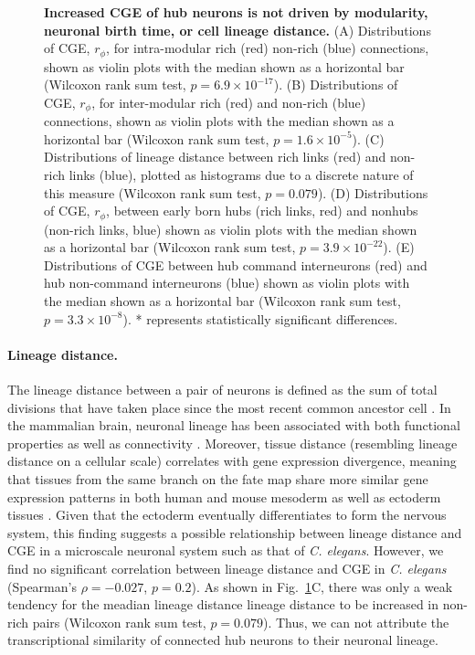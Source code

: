 \documentclass[10pt,letterpaper]{article}
\begin{document}
{\begin{figure}[!h]
\centering
 \caption{
 \textbf{Increased CGE of hub neurons is not driven by modularity, neuronal birth time, or cell lineage distance.}
(A) Distributions of CGE, $r_\phi$, for intra-modular rich (red) non-rich (blue) connections, shown as violin plots with the median shown as a horizontal bar (Wilcoxon rank sum test, $p = 6.9 \times 10^{-17}$).
(B) Distributions of CGE, $r_\phi$, for inter-modular rich (red) and non-rich (blue) connections, shown as violin plots with the median shown as a horizontal bar (Wilcoxon rank sum test, $p = 1.6 \times 10^{-5}$).
(C) Distributions of lineage distance between rich links (red) and non-rich links (blue), plotted as histograms due to a discrete nature of this measure (Wilcoxon rank sum test, $p = 0.079$).
(D) Distributions of CGE, $r_\phi$, between early born hubs (rich links, red) and nonhubs (non-rich links, blue) shown as violin plots with the median shown as a horizontal bar (Wilcoxon rank sum test, $p = 3.9 \times 10^{-22}$).
(E) Distributions of CGE between hub command interneurons (red) and hub non-command interneurons (blue) shown as violin plots with the median shown as a horizontal bar (Wilcoxon rank sum test, $p = 3.3 \times 10^{-8}$).
* represents statistically significant differences.
}
 \label{fig:Fig8}
\end{figure}

\paragraph{Lineage distance.}
The lineage distance between a pair of neurons is defined as the sum of total divisions that have taken place since the most recent common ancestor cell \cite{Pavlovic:2014gx, Sulston1977, Sulston1983}.
In the mammalian brain, neuronal lineage has been associated with both functional properties \cite{Ciceri2013, Li2012} as well as connectivity \cite{Yu2012}.
Moreover, tissue distance (resembling lineage distance on a cellular scale) correlates with gene expression divergence, meaning that tissues from the same branch on the fate map share more similar gene expression patterns in both human and mouse mesoderm as well as ectoderm tissues \cite{Cui2007}.
Given that the ectoderm eventually differentiates to form the nervous system, this finding suggests a possible relationship between lineage distance and CGE in a microscale neuronal system such as that of \textit{C. elegans}.
However, we find no significant correlation between lineage distance and CGE in \textit{C. elegans} (Spearman's $\rho = -0.027$, $p = 0.2$).
As shown in Fig.~\ref{fig:Fig8}C, there was only a weak tendency for the meadian lineage distance lineage distance to be increased in non-rich pairs (Wilcoxon rank sum test, $p = 0.079$).
Thus, we can not attribute the transcriptional similarity of connected hub neurons to their neuronal lineage.


}
\end{document}
